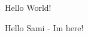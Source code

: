 \documentclass[10pt,a4paper]{article}
\begin{document}
Hello World!

Hello Sami - Im here! 
\end{document}
